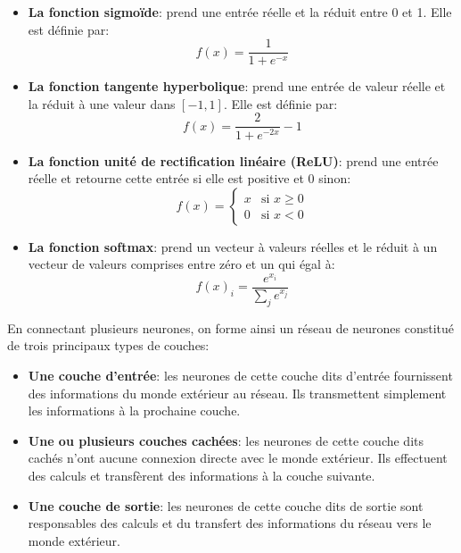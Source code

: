    \begin{itemize}
        \item \textbf{La fonction sigmoïde}: prend une entrée réelle et la réduit entre 0 et 1. Elle est définie par:
            \begin{equation}
                f(x) = \frac{1}{1 + e^{-x}}
            \end{equation}
        \item \textbf{La fonction tangente hyperbolique}: prend une entrée de valeur réelle et la réduit à une valeur dans $[-1, 1]$. Elle est définie par:
            \begin{equation}
                f(x) = \frac{2}{1 + e^{-2x}} - 1 
            \end{equation}
        \item \textbf{La fonction unité de rectification linéaire (ReLU)}: prend une entrée réelle et retourne cette entrée si elle est positive et 0 sinon:
            \begin{equation}
                f(x) = 
                \begin{cases} 
                    x       & \text{si } x \geq 0 \\
                    0       & \text{si } x < 0
                \end{cases}
            \end{equation}
        \item \textbf{La fonction softmax}: prend un vecteur à valeurs réelles et le réduit à un vecteur de valeurs comprises entre zéro et un qui égal à:
            \begin{equation}
                f(x)_{i} = \frac{e^{x_i}}{\sum_{j}e^{x_j}}
            \end{equation}
    \end{itemize}
    En connectant plusieurs neurones, on forme ainsi un réseau de neurones constitué de trois principaux types de couches:
        \begin{itemize}
            \item \textbf{Une couche d'entrée}: les neurones de cette couche dits d'entrée fournissent des informations du monde extérieur au réseau. Ils transmettent simplement les informations à la prochaine couche.
            \item \textbf{Une ou plusieurs couches cachées}: les neurones de cette couche dits cachés n'ont aucune connexion directe avec le monde extérieur. Ils effectuent des calculs et transfèrent des informations à la couche suivante.
            \item \textbf{Une couche de sortie}: les neurones de cette couche dits de sortie sont responsables des calculs et du transfert des informations du réseau vers le monde extérieur.
        \end{itemize}
